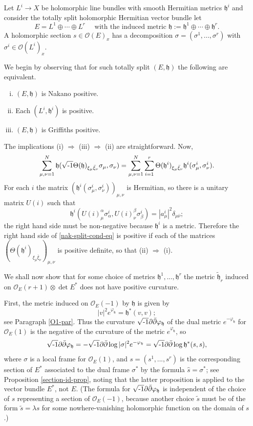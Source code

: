 \documentclass[12pt,hidelinks]{amsart}
\newcommand{\cO}{{\mathcal O}}
\newcommand{\fh}{{\mathfrak h}}
\newcommand{\vp}{\varphi}
\newcommand{\di}{\partial}
\newcommand{\dbar}{\bar \partial}
\newcommand{\ii}{\sqrt{\text{\rm -}1}}
\newcommand{\tensor}{\otimes}
\begin{document}
\begin{ex}
Let $L^i  \to X$ be holomorphic line bundles with smooth Hermitian metrics $\fh^i$ and consider the totally split holomorphic Hermitian vector bundle let 
\[
E = L^1 \oplus \cdots \oplus L^r \quad \text{ with the induced metric }\fh := \fh ^1 \oplus \cdots \oplus \fh ^r.
\]
A holomorphic section $s \in \cO (E)_x$ has a decomposition $\sigma = (\sigma^1,...,\sigma^r)$ with $\sigma^i \in \cO (L^{i})_x$.

We begin by observing that for such totally split $(E,\fh)$ the following are equivalent.
\begin{enumerate}[i.]
\item $(E, \fh)$ is Nakano positive.
\item Each $(L^i,\fh^i)$ is positive.
\item $(E,\fh)$ is Griffiths positive.
\end{enumerate}
The implications (i) $\Rightarrow$ (iii) $\Rightarrow$ (ii) are straightforward. Now, 
\begin{equation}\label{nak-split-cond-eq}
\sum _{\mu,\nu=1} ^N \fh (\ii \Theta (\fh)_{\xi _{\mu}\bar \xi _{\nu}}\sigma_{\mu},\sigma_{\nu}) = \sum _{\mu,\nu =1} ^N \sum _{i=1} ^r \Theta (\fh ^i)_{\xi _{\mu}\bar \xi _{\nu}} \fh ^i (\sigma_{\mu}^i, \sigma_{\nu}^i).
\end{equation}
For each $i$ the matrix $\left (\fh ^i (\sigma_{\mu}^i, \sigma_{\nu}^i) \right )_{\mu, \nu}$ is Hermitian, so there is a unitary matrix $U(i)$ such that
\[
\fh ^i (U(i)_{\mu} ^{\alpha} \sigma_{\alpha}^i, U(i)_{\nu}^{\beta} \sigma_{\beta}^i) = |a^i_{\mu}|^2 \delta _{\mu \bar \nu};
\]
the right hand side must be non-negative because $\fh ^i$ is a metric.  Therefore the right hand side of \eqref{nak-split-cond-eq} is positive if each of the matrices $\left ( \Theta (\fh ^i)_{\xi _{\mu}\bar \xi _{\nu}} \right )_{\mu,\nu}$ is positive definite, so that (ii)  $\Rightarrow$ (i).

We shall now show that for some choice of metrics $\fh ^1,..., \fh ^r$ the metric $\tilde \fh _r$ induced on $\cO_E(r+1)\tensor \det E^*$ does not have positive curvature.  

First, the metric induced on $\cO _E(-1)$ by $\fh$ is given by 
\[
|v|^2e^{\vp_{\fh}} = \fh ^*(v,v);
\]
see Paragraph \ref{O1-par}.  Thus the curvature $\ii \di \dbar \vp _{\fh}$ of the dual metric $e^{-\vp _{\fh}}$ for $\cO_E(1)$ is the negative of the curvature of the metric $e^{\vp _{\fh}}$, so 
\[
\ii \di \dbar \vp _{\fh} = - \ii \di \dbar \log |\sigma|^2e^{-\vp_{\fh}} = \ii \di \dbar \log \fh ^*(s,s),
\]
where $\sigma$ is a local frame for $\cO_E(1)$, and $s= (s^1,...,s^r)$ is the corresponding section of $E^*$ associated to the dual frame $\sigma ^*$ by the formula $\hat s = \sigma ^*$; see Proposition \ref{section-id-prop}, noting that the latter proposition is applied to the vector bundle $E^*$, not $E$.  (The formula for $\ii \di \dbar \vp _{\fh}$ is independent of the choice of $s$ representing a section of $\cO_E(-1)$, because another choice $\tilde s$ must be of the form $\tilde s = \lambda s$ for some nowhere-vanishing holomorphic function on the domain of $s$.)


\end{ex}
\end{document}
